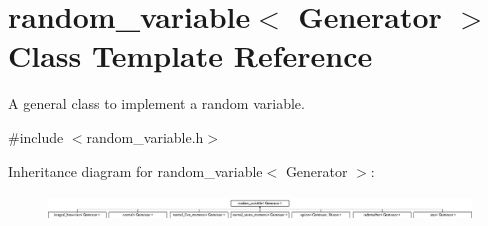 \hypertarget{classrandom__variable}{}\section{random\+\_\+variable$<$ Generator $>$ Class Template Reference}
\label{classrandom__variable}


A general class to implement a random variable.  




{\ttfamily \#include $<$random\+\_\+variable.\+h$>$}

Inheritance diagram for random\+\_\+variable$<$ Generator $>$\+:\begin{figure}[H]
\begin{center}
\leavevmode
\includegraphics[height=0.680851cm]{classrandom__variable}
\end{center}
\end{figure}
